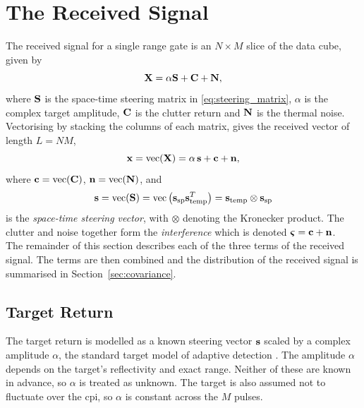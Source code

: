 \documentclass[12pt, a4paper]{report}
\begin{document}
\newpage
\section{The Received Signal}\label{sec:received_signal}\label{sec:interference}
The received signal for a single range gate is an $N\times M$ slice of the data cube, given by
\begin{equation}
    \mathbf{X} = \alpha\mathbf{S} + \mathbf{C} + \mathbf{N},
    \label{eq:received_mat}
\end{equation}
where $\mathbf{S}$ is the space-time steering matrix in \eqref{eq:steering_matrix}, $\alpha$ is the complex target amplitude, $\mathbf{C}$ is the clutter return and $\mathbf{N}$ is the thermal noise. Vectorising by stacking the columns of each matrix, gives the received vector of length $L=NM$,
\begin{equation}
    \vb x = \operatorname{vec}(\mathbf{X}) = \alpha\,\vb s + \vb c + \vb n,
    \label{eq:received_vec}
\end{equation}
where $\vb c=\operatorname{vec}(\mathbf{C})$, $\vb n=\operatorname{vec}(\mathbf{N})$, and
\begin{equation}
    \vb s = \operatorname{vec}(\mathbf{S}) = \operatorname{vec}\big(\vb s_\mathrm{sp}\vb s_\mathrm{temp}^T\big) = \vb s_\mathrm{temp}\otimes\vb s_\mathrm{sp}
    \label{eq:s}
\end{equation}
is the \emph{space-time steering vector}, with $\otimes$ denoting the Kronecker product. The clutter and noise together form the \emph{interference} which is denoted $\boldsymbol{\varsigma} = \vb c + \vb n$. \\

The remainder of this section describes each of the three terms of the received signal. The terms are then combined and the distribution of the received signal is summarised in Section~\ref{sec:covariance}.\\

\subsection{Target Return}
\label{sec:target_return}
The target return is modelled as a known steering vector $\vb s$ scaled by a complex amplitude $\alpha$, the standard target model of adaptive detection \cite{Kelly1986}. The amplitude $\alpha$ depends on the target's reflectivity and exact range. Neither of these are known in advance, so $\alpha$ is treated as unknown. The target is also assumed not to fluctuate over the \gls{cpi}, so $\alpha$ is constant across the $M$ pulses.\\
\end{document}
